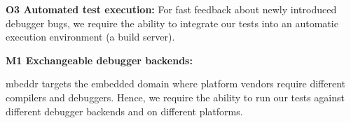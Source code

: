 \textbf{\label{O3}O3 Automated test execution:} For fast
feedback about newly introduced debugger bugs, 
we require the ability to integrate our 
tests into an automatic execution environment (\eg a build server). 

\textbf{\label{M1}M1 Exchangeable debugger backends:}

mbeddr targets the embedded domain where platform vendors require different
compilers and debuggers. Hence, we require the ability to run our tests against
different debugger backends and on different platforms. 
